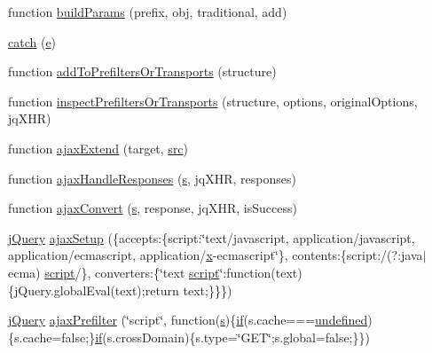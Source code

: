 \begin{DoxyCompactItemize}
\item 
function \hyperlink{_scripts_2jquery-1_810_82_8js_a3c4f3b337daa2444fa73ee856be5f9d8}{build\+Params} (prefix, obj, traditional, add)
\item 
\hyperlink{_scripts_2jquery-1_810_82_8js_a5bf45fc51bc0426586792b5f9cb95431}{catch} (\hyperlink{jquery_8unobtrusive-ajax_8min_8js_a1bbdb559c9d41205c42f84b233650eb3}{e})
\item 
function \hyperlink{_scripts_2jquery-1_810_82_8js_ae8bffbac8c6b2208e0ca37b475ec0b70}{add\+To\+Prefilters\+Or\+Transports} (structure)
\item 
function \hyperlink{_scripts_2jquery-1_810_82_8js_ac96b244aea80657fe2d6e3d2c1e8b622}{inspect\+Prefilters\+Or\+Transports} (structure, options, original\+Options, jq\+X\+H\+R)
\item 
function \hyperlink{_scripts_2jquery-1_810_82_8js_a113ade43cfd5328ebd5ccc84f45fe4de}{ajax\+Extend} (target, \hyperlink{_facebook_8js_a669962a32e24fe52ad2ad277d2037f70}{src})
\item 
function \hyperlink{_scripts_2jquery-1_810_82_8js_a71c2db7846f21963cee426cb81003c63}{ajax\+Handle\+Responses} (\hyperlink{_scripts_2respond_8min_8js_ad9a7d92cb87932d25187fdec3ba1b621}{s}, jq\+X\+H\+R, responses)
\item 
function \hyperlink{_scripts_2jquery-1_810_82_8js_a549518271b8708165811ae69c274b58a}{ajax\+Convert} (\hyperlink{_scripts_2respond_8min_8js_ad9a7d92cb87932d25187fdec3ba1b621}{s}, response, jq\+X\+H\+R, is\+Success)
\item 
\hyperlink{_scripts_2jquery-1_810_82_8js_a5e01048fbd3a30b44e8d491d8945c457}{j\+Query} \hyperlink{_scripts_2jquery-1_810_82_8js_a52a40924d02e0d9756f051e36a640cd6}{ajax\+Setup} (\{accepts\+:\{script\+:\char`\"{}text/javascript, application/javascript, application/ecmascript, application/\hyperlink{_scripts_2jquery-1_810_82_8min_8js_a5ce50d751c9664d05375c8f5080ed43e}{x}-\/ecmascript\char`\"{}\}, contents\+:\{script\+:/(?\+:java$\vert$ecma) \hyperlink{_facebook_8js_a52387f82090b097f98a1a44fa72ac060}{script}/\}, converters\+:\{\char`\"{}text \hyperlink{_facebook_8js_a52387f82090b097f98a1a44fa72ac060}{script}\char`\"{}\+:function(text)\{j\+Query.\+global\+Eval(text);return text;\}\}\})
\item 
\hyperlink{_scripts_2jquery-1_810_82_8js_a5e01048fbd3a30b44e8d491d8945c457}{j\+Query} \hyperlink{_scripts_2jquery-1_810_82_8js_a144939e373cc1ad511a53c4251ec7ffa}{ajax\+Prefilter} (\char`\"{}script\char`\"{}, function(\hyperlink{_scripts_2respond_8min_8js_ad9a7d92cb87932d25187fdec3ba1b621}{s})\{\hyperlink{_scripts_2respond_8min_8js_a93851d60dd037a83509a1757b9ee7b66}{if}(s.\+cache===\hyperlink{_scripts_2jquery-1_810_82_8js_a08113a236cc18d2a9d5ce27e638012be}{undefined})\{s.\+cache=false;\}\hyperlink{_scripts_2respond_8min_8js_a93851d60dd037a83509a1757b9ee7b66}{if}(s.\+cross\+Domain)\{s.\+type=\char`\"{}G\+E\+T\char`\"{};s.\+global=false;\}\})

\end{DoxyCompactItemize}
